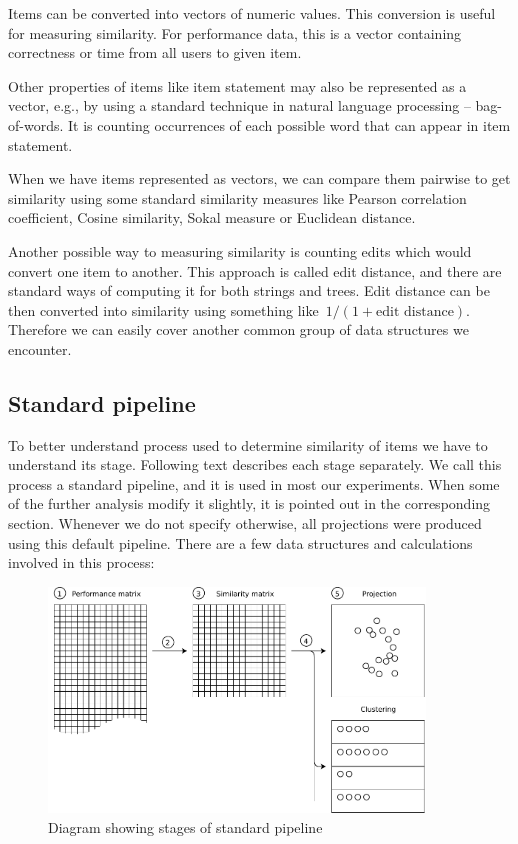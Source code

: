 \documentclass[
  print, %
  table,   %
  nolof,     %
  nolot,     %
  nocover,
  color,
  final,
]{fithesis3}
\begin{document}

Items can be converted into vectors of numeric values. This conversion is useful for measuring similarity. For performance data, this is a vector containing correctness or time from all users to given item.

Other properties of items like item statement may also be represented as a vector, e.g., by using a standard technique in natural language processing -- bag-of-words. It is counting occurrences of each possible word that can appear in item statement.

When we have items represented as vectors, we can compare them pairwise to get similarity using some standard similarity measures like Pearson correlation coefficient, Cosine similarity, Sokal measure or Euclidean distance.


Another possible way to measuring similarity is counting edits which would convert one item to another. This approach is called edit distance, and there are standard ways of computing it for both strings and trees. Edit distance can be then converted into similarity using something like~$1 / (1 + \text{edit distance})$. Therefore we can easily cover another common group of data structures we encounter.


\subsection{Standard pipeline}\label{standard-pipeline}


To better understand process used to determine similarity of items we have to understand its stage. Following text describes each stage separately. We call this process a standard pipeline, and it is used in most our experiments. When some of the further analysis modify it slightly, it is pointed out in the corresponding section. Whenever we do not specify otherwise, all projections were produced using this default pipeline. There are a few data structures and calculations involved in this process:

\begin{figure}
  \includegraphics[width=10cm]{img/pipeline_diagram}
  \caption{Diagram showing stages of standard pipeline}
  \label{fig:pipeline_diagram}
\end{figure}
\end{document}
